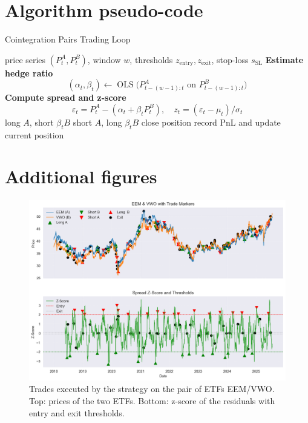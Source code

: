\documentclass{article}
\begin{document}
\section{Algorithm pseudo-code}
\begin{algorithm}[h!tbp]
\caption{Cointegration Pairs Trading Loop}
\label{alg:pairs}
\begin{algorithmic}[1]
\Require price series $(P^A_t, P^B_t)$, window $w$,
         thresholds $z_{\text{entry}}, z_{\text{exit}}$,
         stop-loss $s_{\text{SL}}$
\Statex
{}
    \State \textbf{Estimate hedge ratio}
          \[
            (\alpha_t, \beta_t) \gets
            \operatorname{OLS}\bigl(P^{A}_{t-(w-1):t}
            \text{ on } P^{B}_{t-(w-1):t}\bigr)
          \]
    \State \textbf{Compute spread and z-score}
          \[
            \varepsilon_t = P^A_t - (\alpha_t + \beta_t P^B_t),\quad
            z_t = (\varepsilon_t - \mu_t)/\sigma_t
          \]
            \State long $A$, short $\beta_t B$
            \State short $A$, long $\beta_t B$
        \EndIf
    \Else
            \State close position
        \EndIf
    \EndIf
    \State record PnL and update current position
\EndFor
\end{algorithmic}
\end{algorithm}

\newpage

\section{Additional figures}
\begin{figure}[htbp]
\centering
\includegraphics[width=\linewidth]{eem_vwo_trades.png}
\caption{Trades executed by the strategy on the pair of ETFs EEM/VWO. Top: prices of the two ETFs. Bottom: z-score of the residuals with entry and exit thresholds.}
\label{fig:trades_eem_vwo}
\end{figure}
\end{document}
